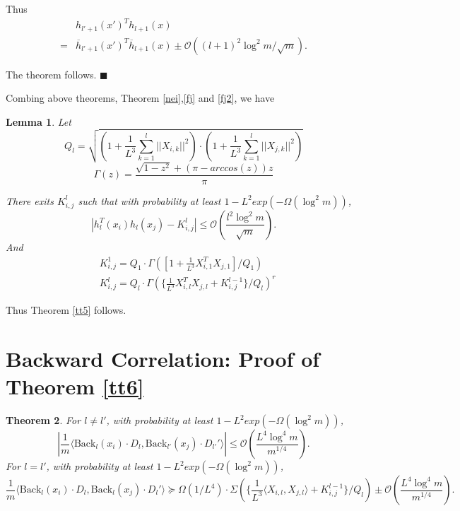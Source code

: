 \documentclass{article}
\newcommand{\cO}{\mathcal{O}}
\newtheorem{theo}{\textbf{Theorem}}
\newtheorem{lem}[theo]{\textbf{Lemma}}
\newcommand*{\QEDA}{\hfill\ensuremath{\blacksquare}}%
\begin{document}
Thus
\begin{equation}
\begin{aligned}
&h_{l'+1}(x')^Th_{l+1}(x)\\
=&\overline{h}_{l'+1}(x')^T\overline{h}_{l+1}(x)\pm \cO((l+1)^{2}\log^2m/\sqrt{m}).
\end{aligned}
\end{equation}

The theorem follows.
\QEDA

Combing above theorems, Theorem \ref{nei},\ref{fj} and \ref{fj2}, we have
\begin{lem}\label{io}
Let $$Q_l=\sqrt{(1+\frac{1}{L^3}\sum_{k=1}^l||X_{i,k}||^2)\cdot(1+\frac{1}{L^3}\sum_{k=1}^l||X_{j,k}||^2) }$$
 $$\Gamma(z)=\frac{\sqrt{1-z^2}+(\pi-arccos(z))z}{\pi}$$

There exits $K^l_{i,j}$ such that with probability at least $1-L^2exp(-\Omega(\log^2m))$,
\begin{equation}
|h_{l}^T(x_i)h_{l}(x_j)-K^l_{i,j}|\leq \cO( \frac{l^{2}\log^2m}{\sqrt{m}}).
\end{equation}
And
\begin{equation}
\begin{aligned}
&K^1_{i,j}= Q_1\cdot\Gamma([1+\frac{1}{L^3}X_{i,1}^TX_{j,1}]/Q_1)\\
&K^{l}_{i,j}=Q_l\cdot\Gamma(\{\frac{1}{L^3}X_{i,l}^TX_{j,l}+ K^{l-1}_{i,j}\}/Q_l)^r
\end{aligned}
\end{equation}
\end{lem}
Thus Theorem \ref{tt5} follows.
\section{Backward Correlation: Proof of Theorem \ref{tt6}}
\begin{theo}\label{t17}
For $l\neq l'$, with probability at least $1-L^2exp(-\Omega(\log^2m))$,
\begin{equation}\label{ea}
|\frac{1}{m}\langle \text{Back}_l(x_i)\cdot D_l,\text{Back}_{l'}(x_j)\cdot D_{l'}' \rangle| \leq \cO(\frac{L^4\log^4 m}{m^{1/4}}).
\end{equation}
For $l=l'$, with probability at least $1-L^2exp(-\Omega(\log^2m))$,
\begin{equation}\label{eb}
\frac{1}{m}\langle \text{Back}_l(x_i)\cdot D_l,\text{Back}_{l}(x_j)\cdot D_{l}' \rangle \succeq \Omega(1/L^4)\cdot \Sigma(\{ \frac{1}{L^3}\langle X_{i,l}, X_{j,l} \rangle +K^{l-1}_{i,j}\}/Q_l)\pm \cO(\frac{L^4\log^4 m}{m^{1/4}}).
\end{equation}
\end{theo}
\end{document}
